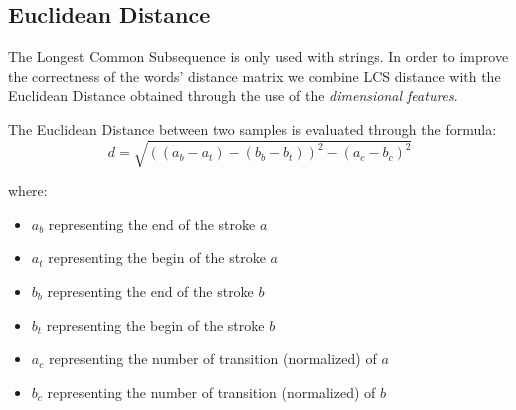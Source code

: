 \subsection{Euclidean Distance} 

The Longest Common Subsequence is only used with strings. In order to improve the correctness of the words' distance matrix we combine LCS distance with the Euclidean Distance obtained through the use of the \textit{dimensional features}.

The Euclidean Distance between two samples is evaluated through the formula:
$$d = \sqrt{((a_b - a_t)−(b_b - b_t))^2 -(a_c - b_c)^2}$$

where:
\begin{itemize}
\item $a_b$ representing the end of the stroke $a$
\item $a_t$ representing the begin of the stroke $a$
\item $b_b$ representing the end of the stroke $b$
\item $b_t$ representing the begin of the stroke $b$
\item $a_c$ representing the number of transition (normalized) of $a$
\item $b_c$ representing the number of transition (normalized) of $b$
\end{itemize}
